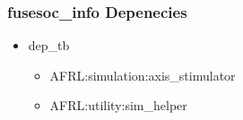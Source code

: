 \subsubsection{fusesoc\_info Depenecies}
\begin{itemize}
\item dep\_tb
	\begin{itemize}
	\item AFRL:simulation:axis\_stimulator
	\item AFRL:utility:sim\_helper
	\end{itemize}
\end{itemize}
